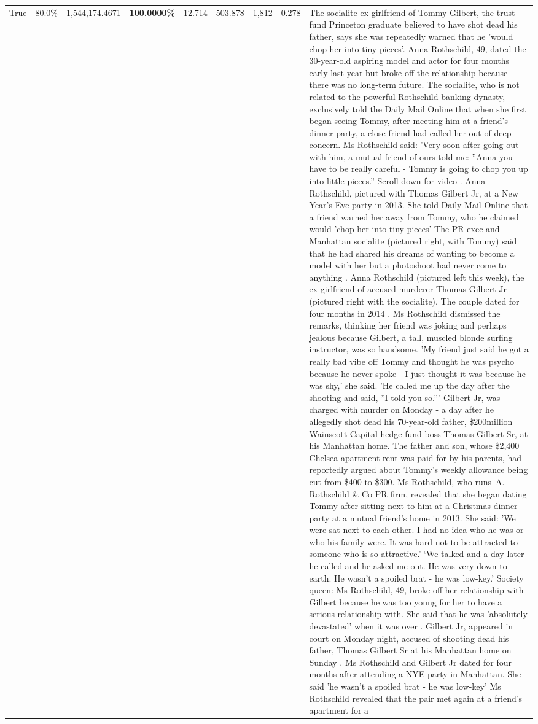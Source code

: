 \begin{table}[H]
\begin{tabular}{lllrlllll}
True & 80.0\% & 1,544,174.4671 & \bfseries \color{red} 100.0000\% & 12.714 & 503.878 & 1,812 & 0.278 & The socialite ex-girlfriend of Tommy Gilbert, the trust-fund Princeton graduate believed to have shot dead his father, says she was repeatedly warned that he 'would chop her into tiny pieces'. Anna Rothschild, 49, dated the 30-year-old aspiring model and actor for four months early last year but broke off the relationship because there was no long-term future. The socialite, who is not related to the powerful Rothschild banking dynasty, exclusively told the Daily Mail Online that when she first began seeing Tommy, after meeting him at a friend's dinner party, a close friend had called her out of deep concern. Ms Rothschild said: 'Very soon after going out with him, a mutual friend of ours told me: ''Anna you have to be really careful - Tommy is going to chop you up into little pieces.'' Scroll down for video . Anna Rothschild, pictured with Thomas Gilbert Jr, at a New Year's Eve party in 2013. She told Daily Mail Online that a friend warned her away from Tommy, who he claimed would 'chop her into tiny pieces' The PR exec and Manhattan socialite (pictured right, with Tommy) said that he had shared his dreams of wanting to become a model with her but a photoshoot had never come to anything . Anna Rothschild (pictured left this week), the ex-girlfriend of accused murderer Thomas Gilbert Jr (pictured right with the socialite). The couple dated for four months in 2014 . Ms Rothschild dismissed the remarks, thinking her friend was joking and perhaps jealous because Gilbert, a tall, muscled blonde surfing instructor, was so handsome. 'My friend just said he got a really bad vibe off Tommy and thought he was psycho because he never spoke - I just thought it was because he was shy,' she said. 'He called me up the day after the shooting and said, ''I told you so.''' Gilbert Jr, was charged with murder on Monday - a day after he allegedly shot dead his 70-year-old father, \$200million Wainscott Capital hedge-fund boss Thomas Gilbert Sr, at his Manhattan home. The father and son, whose \$2,400 Chelsea apartment rent was paid for by his parents, had reportedly argued about Tommy's weekly allowance being cut from \$400 to \$300. Ms Rothschild, who runs A. Rothschild \& Co PR firm, revealed that she began dating Tommy after sitting next to him at a Christmas dinner party at a mutual friend's home in 2013. She said: 'We were sat next to each other. I had no idea who he was or who his family were. It was hard not to be attracted to someone who is so attractive.' ‘We talked and a day later he called and he asked me out. He was very down-to-earth. He wasn’t a spoiled brat - he was low-key.’ Society queen: Ms Rothschild, 49, broke off her relationship with Gilbert because he was too young for her to have a serious relationship with. She said that he was 'absolutely devastated' when it was over . Gilbert Jr, appeared in court on Monday night, accused of shooting dead his father, Thomas Gilbert Sr at his Manhattan home on Sunday . Ms Rothschild and Gilbert Jr dated for four months after attending a NYE party in Manhattan. She said 'he wasn't a spoiled brat - he was low-key' Ms Rothschild revealed that the pair met again at a friend’s apartment for a 
\end{tabular}
\end{table}
